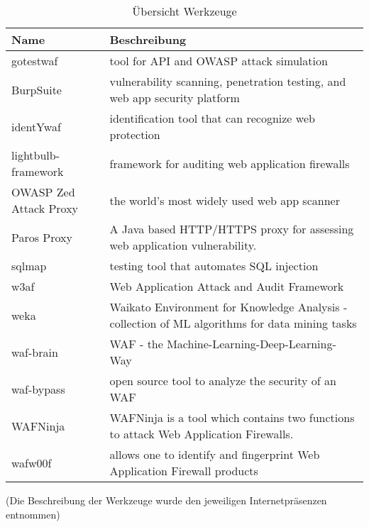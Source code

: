 \begin{table}[h]
  \centering
  \begin{tabular}{lp{7cm}}
    \toprule
    \textbf{Name} & \textbf{Beschreibung} \\
    \midrule
    gotestwaf & tool for API and OWASP attack simulation \\
    BurpSuite & vulnerability scanning, penetration testing, and web app security platform\\
    identYwaf & identification tool that can recognize web protection \\
    lightbulb-framework & framework for auditing web application firewalls \\
    OWASP Zed Attack Proxy & the world's most widely used web app scanner \\
    Paros Proxy & A Java based HTTP/HTTPS proxy for assessing web application vulnerability.\\
    sqlmap & testing tool that automates SQL injection\\
    w3af & Web Application Attack and Audit Framework\\
    weka & Waikato Environment for Knowledge Analysis - collection of ML algorithms for data mining tasks\\
    waf-brain & WAF - the Machine-Learning-Deep-Learning-Way\\
    waf-bypass & open source tool to analyze the security of an WAF\\
    WAFNinja &  WAFNinja is a tool which contains two functions to attack Web Application Firewalls. \\
    wafw00f & allows one to identify and fingerprint Web Application Firewall products\\
    \bottomrule
  \end{tabular}
  
  \caption{Übersicht Werkzeuge}
  \medskip
  \small
  (Die Beschreibung der Werkzeuge wurde den jeweiligen Internetpräsenzen entnommen)
  \label{tab:my_tools}
\end{table}

